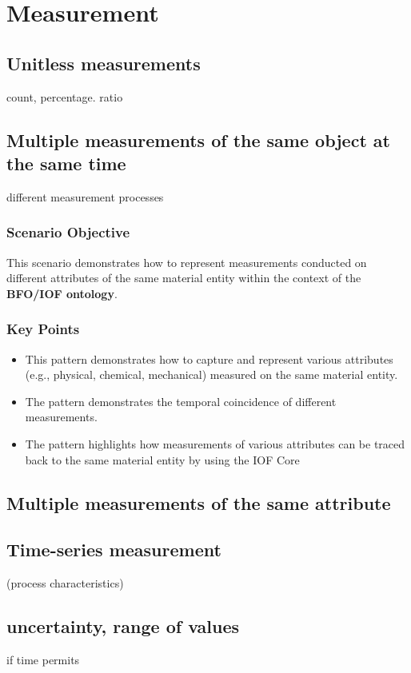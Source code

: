 \chapter{Measurement}


\section{Unitless measurements}
count, percentage. ratio

\section{Multiple measurements of the same object at the same time}
different measurement processes 

\subsection*{Scenario Objective}

This scenario demonstrates how to represent measurements conducted on different attributes of the same material entity within the context of the \textbf{BFO/IOF ontology}.

\subsection*{Key Points}
\begin{itemize}
    \item This pattern demonstrates how to capture and represent various attributes (e.g., physical, chemical, mechanical) measured on the same material entity.
    \item The pattern demonstrates the temporal coincidence of different measurements.
     \item The pattern highlights how measurements of various attributes can be traced back to the same material entity by using the IOF Core
\end{itemize}

\section{Multiple measurements of the same attribute}


\section{Time-series measurement}
(process characteristics)

\section{uncertainty, range of values}
if time permits

